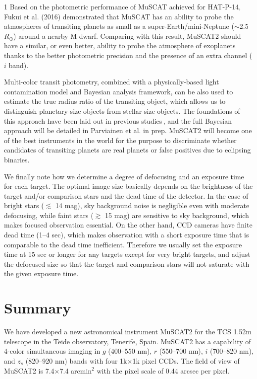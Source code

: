 \documentclass[a4paper,12pt]{spieman}  %
\begin{document}
\begin{spacing}{1}
Based on the photometric performance of MuSCAT achieved for HAT-P-14,
Fukui et al. (2016)\cite{2016ApJ...819...27F} demonstrated that MuSCAT
has an ability to probe the atmospheres of transiting planets
as small as a super-Earth/mini-Neptune ($\sim$2.5 $R_{\oplus}$) around a nearby M dwarf.
Comparing with this result, MuSCAT2 should have a similar, or even better,
ability to probe the atmosphere of exoplanets thanks to the better photometric precision
and the presence of an extra channel ($i$ band).

Multi-color transit photometry, combined with a physically-based light contamination
model and Bayesian analysis framework, can be also used to estimate the
true radius ratio of the transiting object, which allows us to distinguish
planetary-size objects from stellar-size objects.
The foundations of this approach have been laid out in previous
studies\cite{1971Icar...14...71R,2003ApJ...589.1020D,2004A&A...425.1125T}\,\!,
and the full Bayesian approach will be detailed in Parviainen et al. in prep.
MuSCAT2 will become one of the best instruments in the world for the purpose to 
discriminate whether candidates of transiting planets are real planets or false positives
due to eclipsing binaries.

We finally note how we determine a degree of defocusing and an exposure time for each target.
The optimal image size basically depends on the brightness of the target and/or comparison stars
and the dead time of the detector.
In the case of bright stars ($\lesssim$ 14 mag), sky background noise is negligible even with moderate defocusing,
while faint stars ($\gtrsim$ 15 mag) are sensitive to sky background,
which makes focused observation essential.
On the other hand, CCD cameras have finite dead time (1--4 sec),
which makes observation with a short exposure time that is comparable to the dead time inefficient.
Therefore we usually set the exposure time at 15 sec or longer for any targets except for very bright targets,
and adjust the defocused size so that the target and comparison stars will not saturate with the given exposure time.

\section{Summary}
\label{sect:summary}  %

We have developed a new astronomical instrument MuSCAT2 for the TCS 1.52m telescope
in the Teide observatory, Tenerife, Spain.
MuSCAT2 has a capability of 4-color simultaneous imaging in 
$g$ (400--550 nm), $r$ (550--700 nm), $i$ (700--820 nm), and $z_{s}$ (820--920 nm) bands
with four 1k$\times$1k pixel CCDs.
The field of view of  MuSCAT2
is 7.4$\times$7.4 arcmin$^2$ with the pixel scale of 0.44 arcsec per pixel.


\end{spacing}
\end{document}

